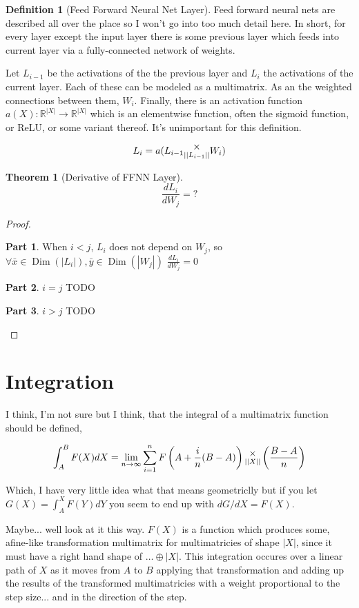\documentclass[12pt]{book}
\theoremstyle{plain}
\newtheorem{theorem}{Theorem}[chapter]
\theoremstyle{definition}
\newtheorem{definition}{Definition}[chapter]
\theoremstyle{ppart}
\newtheorem{ppart}{Part}
\theoremstyle{case}
\theoremstyle{solution}
\DeclareMathOperator{\Dim}{Dim}
\newcommand{\mmult}[1]{\text{\raisebox{1ex}{$\underset{#1}{\times}$}}}
\begin{document}
\begin{definition}[Feed Forward Neural Net Layer]
Feed forward neural nets are described all over the place so I won't go into too
much detail here. In short, for every layer except the input layer there is some
previous layer which feeds into current layer via a fully-connected network of
weights.

Let $L_{i-1}$ be the activations of the the previous layer and $L_i$ the activations
of the current layer. Each of these can be modeled as a multimatrix. As an the weighted
connections between them, $W_i$. Finally, there is an activation function
$a(X) : \mathbb{R}^{|X|} \to \mathbb{R}^{|X|}$ which is an elementwise function,
often the sigmoid function, or ReLU, or some variant thereof. It's unimportant for this
definition.

\[ L_i = a(L_{i-1} \mmult{||L_{i-1}||} W_i) \]
\end{definition}

\begin{theorem}[Derivative of FFNN Layer]
\[ \frac{dL_i}{dW_j} = ? \]
\end{theorem}
\begin{proof}
\begin{ppart} When $i < j$,
$L_i$ does not depend on $W_j$, so 
$\forall \bar{x} \in \Dim(|L_i|), \bar{y} \in \Dim(|W_j|)$
$\frac{dL_i}{dW_j} = 0$
\end{ppart}
\begin{ppart} $i = j$
TODO
\end{ppart}
\begin{ppart} $i > j$
TODO
\end{ppart}
\end{proof}

\chapter{Integration}

I think, I'm not sure but I think, that the integral of a multimatrix function should
be defined,

\[
 \int_A^B F(X) dX = \lim_{n \to \infty}
 \sum_{i=1}^n
  F\left(A+\frac{i}{n}(B-A)\right)
  \mmult{||X||}
  \left(\frac{B-A}{n}\right)
\]

Which, I have very little idea what that means geometriclly but
if you let $G(X) = \int_A^X F(Y) dY$ you seem to end up with $dG/dX = F(X)$.

Maybe... well look at it this way. $F(X)$ is a function which produces some,
afine-like transformation multimatrix for multimatricies of shape $|X|$,
since it must have a right hand shape of $\ldots \oplus |X|$. This integration
occures over a linear path of $X$ as it moves from $A$ to $B$ applying that
transformation and adding up the results of the transformed multimatricies with
a weight proportional to the step size... and in the direction of the step.
\end{document}
